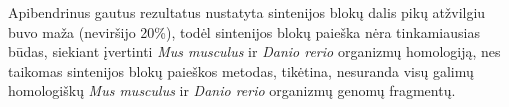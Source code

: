 \documentclass[12pt]{article}
\begin{document}
Apibendrinus gautus rezultatus nustatyta sintenijos blokų dalis
pikų atžvilgiu buvo maža (neviršijo 20\%), todėl sintenijos blokų paieška
nėra tinkamiausias būdas, siekiant įvertinti \emph{Mus musculus} ir
\emph{Danio rerio} organizmų homologiją, nes taikomas sintenijos blokų
paieškos metodas, tikėtina, nesuranda visų galimų homologiškų
\emph{Mus musculus} ir \emph{Danio rerio} organizmų genomų fragmentų.

\newpage




\end{document}

